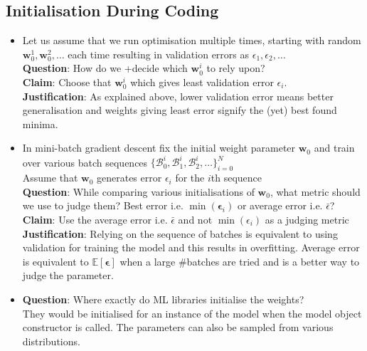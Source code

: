 \documentclass[12pt]{article}
\begin{document}
\subsection{Initialisation During Coding}
    \begin{itemize}
        \item Let us assume that we run optimisation multiple times, starting with random $\mathbf{w}_0^1, \mathbf{w}_0^2, \ldots$ each time resulting in validation errors as $\epsilon_1, \epsilon_2, \ldots$
        \\
        \textbf{Question}: How do we +decide which $\mathbf{w}_0^i$ to rely upon?\\
        \textbf{Claim}: Choose that $\mathbf{w}_0^i$ which gives least validation error $\epsilon_i$.\\
        \textbf{Justification}: As explained above, lower validation error means better generalisation and weights giving least error signify the (yet) best found minima.
        
        \item In mini-batch gradient descent fix the initial weight parameter $\mathbf{w}_0$ and train over various batch sequences $\{\mathcal{B}_0^i, \mathcal{B}_1^i, \mathcal{B}_2^i, \ldots\}_{i = 0}^N$\\
        Assume that $\mathbf{w}_0$ generates error $\epsilon_i$ for the $i$th sequence 
        \\
        \textbf{Question}: While comparing various initialisations of $\mathbf{w}_0$, what metric should we use to judge them? Best error i.e. $\min(\mathbf{\epsilon}_i)$ or average error i.e. $\bar{\epsilon}$?\\
        \textbf{Claim}: Use the average error i.e. $\bar{\epsilon}$ and not $\min(\epsilon_i)$ as a judging metric\\
        \textbf{Justification}: Relying on the sequence of batches is equivalent to using validation for training the model and this results in overfitting. Average error is equivalent to $\mathbb{E}[\mathbf{\epsilon}]$ when a large \#batches are tried and is a better way to judge the parameter.
        
        \item \textbf{Question}: Where exactly do ML libraries initialise the weights?\\
They would be initialised for an instance of the model when the model object constructor is called. The parameters can also be sampled from various distributions.\cite{he}


\end{itemize}
\end{document}
